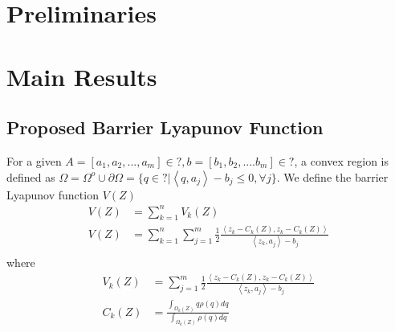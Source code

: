\documentclass[journal]{IEEEtran}
\begin{document}
\section{Preliminaries}

\section{Main Results}
\subsection{Proposed Barrier Lyapunov Function} 
For a given $A = [a_1, a_2, ..., a_m] \in ?, b = [b_1, b_2, .... b_m] \in ?$, a convex region is defined as $\Omega = \Omega^o \cup \partial \Omega = \{q \in ?| \left<q, a_j\right> - b_j \leq 0, \forall j\}$. We define the barrier Lyapunov function $V(Z)$
\begin{equation}  \label{eqn:V}
\begin{split}
V(Z) & = \sum^{n}_{k=1} V_k(Z) \\
V(Z) & = \sum^{n}_{k=1} \sum^{m}_{j=1} \frac{1}{2} \frac{\left< z_k - C_k(Z), z_k - C_k(Z)\right>}{\left<z_k, a_j \right> - b_j}  \\
\end{split}
\end{equation}
where 
\begin{equation}
\begin{split}
V_k(Z) & = \sum^{m}_{j=1} \frac{1}{2} \frac{\left< z_k - C_k(Z), z_k - C_k(Z)\right>}{\left<z_k, a_j \right> - b_j} \\ %
C_k(Z) & = \frac{\int_{\Omega_{k}(Z)}^{} q\rho(q)dq}{\int_{\Omega_{k}(Z)}^{} \rho(q)dq} \\ %
\end{split}
\end{equation}
\end{document}

